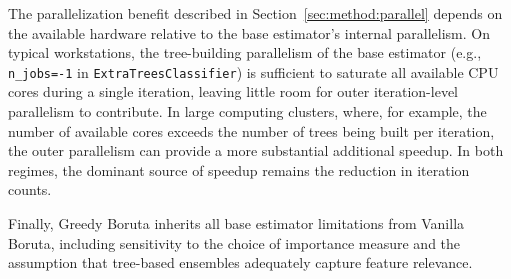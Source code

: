 \documentclass[runningheads]{llncs}
\newcommand{\writeme}[1]{\todo[inline,color=yellow!40]{WRITE: #1}}
\begin{document}

The parallelization benefit described in Section~\ref{sec:method:parallel} depends on the available hardware relative to the base estimator's internal parallelism. On typical workstations, the tree-building parallelism of the base estimator (e.g., \texttt{n\_jobs=-1} in \texttt{ExtraTreesClassifier}) is sufficient to saturate all available CPU cores during a single iteration, leaving little room for outer iteration-level parallelism to contribute. In large computing clusters, where, for example, the number of available cores exceeds the number of trees being built per iteration, the outer parallelism can provide a more substantial additional speedup. In both regimes, the dominant source of speedup remains the reduction in iteration counts.

Finally, Greedy Boruta inherits all base estimator limitations from Vanilla Boruta, including sensitivity to the choice of importance measure and the assumption that tree-based ensembles adequately capture feature relevance.



\end{document}
